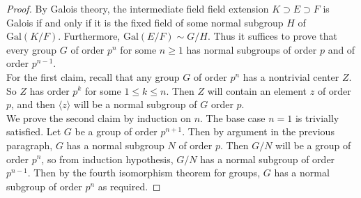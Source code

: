 \documentclass{article}
\begin{document}
  \begin{proof}
    By Galois theory, the intermediate field field extension $K\supset
    E\supset F$ is Galois if and only if it is the fixed field of some
    normal subgroup $H$ of $\text{Gal}(K/F)$. Furthermore,
    $\text{Gal}(E/F)\sim G/H$. Thus it suffices to prove that every group
    $G$ of order $p^n$ for some $n\geq1$ has normal subgroups of order $p$
    and of order $p^{n-1}$. \\

    For the first claim, recall that any group $G$ of order $p^n$ has a
    nontrivial center $Z$. So $Z$ has order $p^k$ for some $1\leq k\leq n$.
    Then $Z$ will contain an element $z$ of order $p$, and then $\langle
    z\rangle$ will be a normal subgroup of $G$ order $p$. \\

    We prove the second claim by induction on $n$. The base case $n=1$ is
    trivially satisfied. Let $G$ be a group of order $p^{n+1}$. Then by
    argument in the previous paragraph, $G$ has a normal subgroup $N$ of
    order $p$. Then $G/N$ will be a group of order $p^n$, so from induction
    hypothesis, $G/N$ has a normal subgroup of order $p^{n-1}$. Then by the
    fourth isomorphism theorem for groups, $G$ has a normal subgroup of
    order $p^n$ as required.
  \end{proof}
\end{document}
